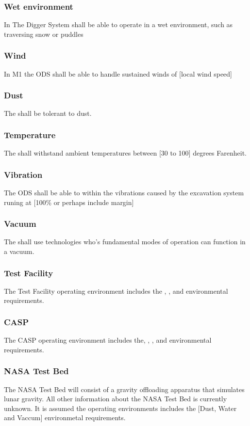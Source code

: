 \subsubsection{Wet environment}
\label{ref:Wet environment}
In  The Digger System shall be able to operate in a wet environment, such as traversing snow or puddles
\subsubsection{Wind}
\label{ref:Wind}
In M1 the ODS shall be able to handle sustained winds of [local wind speed]
\subsubsection{Dust}
\label{ref:Dust}
The  shall be tolerant to dust. 
\subsubsection{Temperature}
\label{ref:Temperature}
The  shall withstand ambient temperatures between [30 to 100] degrees Farenheit.
\subsubsection{Vibration}
\label{ref:Vibration}
The ODS shall be able to within the vibrations caused by the excavation system runing at [100\% or perhaps include margin]
\subsubsection{Vacuum}
\label{ref:Vacuum}
The  shall use technologies who's fundamental modes of operation can function in a vacuum.
\subsubsection{Test Facility}
\label{ref:Test Facility}
The Test Facility operating environment includes the , , and  environmental requirements. 
\subsubsection{CASP}
\label{ref:CASP}
The CASP operating environment includes the, , , and  environmental requirements. 
\subsubsection{NASA Test Bed}
\label{ref:NASA Test Bed}
The NASA Test Bed will consist of a gravity offloading apparatus that simulates lunar gravity. All other information about the NASA Test Bed is currently unknown. It is assumed the operating environments includes the [Dust, Water and Vaccum] environmetal requirements.
